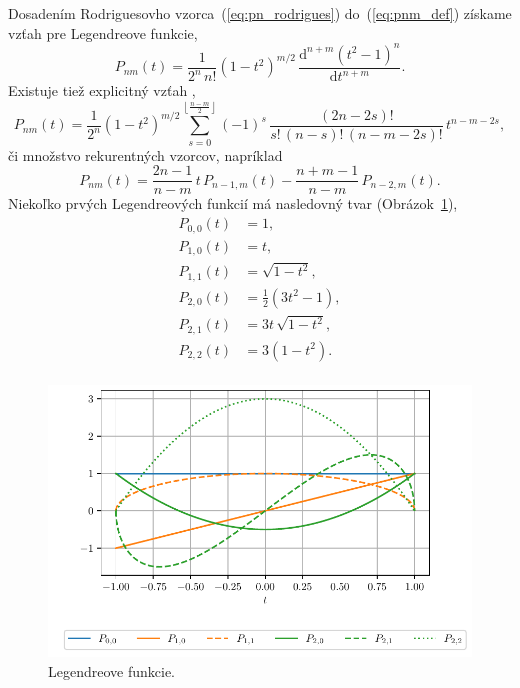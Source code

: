 \documentclass[a4paper,12pt]{book}
\newcommand{\diff}{\mathrm d}
\begin{document}
Dosadením Rodriguesovho vzorca~(\ref{eq:pn_rodrigues}) do~(\ref{eq:pnm_def})
získame vzťah pre Legendreove funkcie,
%
\begin{equation}
\label{eq:pnm_ferrer}
P_{nm}(t) = \frac{1}{2^n \, n!} (1 - t^2)^{ m \slash 2} \, \frac{\diff^{n + m}
(t^2 - 1)^n}{\diff t^{n + m}}{.}
\end{equation}
%
Existuje tiež explicitný vzťah \parencite{Freeden2009},
%
\begin{equation}
P_{nm}(t) = \frac{1}{2^n}(1 - t^2)^{m \slash 2} \sum_{s = 0}^{\left\lfloor
\frac{n - m}{2} \right\rfloor} (-1)^s \, \frac{(2n - 2s)!}{s! \, (n - s)! \, (n
- m - 2s)!} \, t^{n - m - 2s}{,}
\end{equation}
%
či
%
množstvo rekurentných vzorcov, napríklad \parencite{Freeden2009}
%
\begin{equation}
\label{eq:pnm_recurrence}
P_{nm}(t) = \frac{2n - 1}{n - m} \, t \, P_{n - 1, m}(t) - \frac{n + m - 1}{n
- m} \, P_{n - 2, m}(t){.}
\end{equation}
%
Niekoľko prvých Legendreových funkcií má nasledovný tvar
(Obrázok~\ref{fig:lf}),
%
\begin{equation}
\label{eq:lf00_to_lf22}
\begin{split}
P_{0,0}(t) & = 1{,}\\
P_{1,0}(t) & = t{,}\\
P_{1,1}(t) & = \sqrt{1 - t^2}{,}\\
P_{2,0}(t) & = \frac{1}{2}(3t^2 - 1){,}\\
P_{2,1}(t) & = 3t \, \sqrt{1 - t^2}{,}\\
P_{2,2}(t) & = 3(1 - t^2){.}\\
\end{split}
\end{equation}

\begin{figure}[bt]
\centering
\includegraphics{./fig-legendre-functions.pdf}
\caption{Legendreove funkcie.}
\label{fig:lf}
\end{figure}
\end{document}
